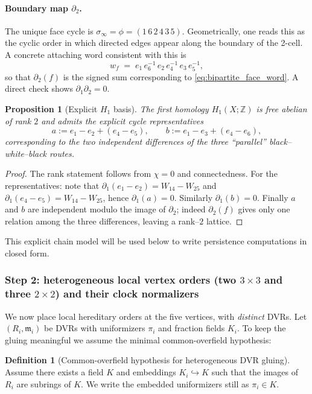 \documentclass[11pt,oneside]{amsbook}
\numberwithin{equation}{section}
\theoremstyle{plain}
\newtheorem{proposition}[theorem]{Proposition}
\theoremstyle{definition}
\newtheorem{definition}[theorem]{Definition}
\theoremstyle{remark}
\newcommand{\Z}{\mathbb{Z}}
\begin{document}
\paragraph{Boundary map $\partial_2$.}
The unique face cycle is $\sigma_\infty=\phi=(1\,6\,2\,4\,3\,5)$.
Geometrically, one reads this as the cyclic order in which directed edges appear along the boundary of the 2-cell.
A concrete attaching word consistent with this is
\begin{equation}
\label{eq:bipartite_face_word}
w_f \;=\; e_1\,e_6^{-1}\,e_2\,e_4^{-1}\,e_3\,e_5^{-1},
\end{equation}
so that $\partial_2(f)$ is the signed sum corresponding to \eqref{eq:bipartite_face_word}.
A direct check shows $\partial_1\partial_2=0$.

\begin{proposition}[Explicit $H_1$ basis]
The first homology $H_1(X;\Z)$ is free abelian of rank $2$ and admits the explicit cycle representatives
\[
a := e_1-e_2 + (e_4-e_5),\qquad 
b := e_1-e_3 + (e_4-e_6),
\]
corresponding to the two independent differences of the three ``parallel'' black--white--black routes.
\end{proposition}

\begin{proof}
The rank statement follows from $\chi=0$ and connectedness.
For the representatives: note that $\partial_1(e_1-e_2)=W_{14}-W_{25}$ and $\partial_1(e_4-e_5)=W_{14}-W_{25}$, hence $\partial_1(a)=0$.
Similarly $\partial_1(b)=0$.
Finally $a$ and $b$ are independent modulo the image of $\partial_2$; indeed $\partial_2(f)$ gives only one relation among the three differences, leaving a rank--$2$ lattice.
\end{proof}

This explicit chain model will be used below to write persistence computations in closed form.

\subsubsection{Step 2: heterogeneous local vertex orders (two $3\times 3$ and three $2\times 2$) and their clock normalizers}

We now place local hereditary orders at the five vertices, with \emph{distinct} DVRs.
Let $(R_i,\mathfrak m_i)$ be DVRs with uniformizers $\pi_i$ and fraction fields $K_i$.
To keep the gluing meaningful we assume the minimal common-overfield hypothesis:

\begin{definition}[Common-overfield hypothesis for heterogeneous DVR gluing]
\label{def:common_overfield}
Assume there exists a field $K$ and embeddings $K_i\hookrightarrow K$ such that the images of $R_i$ are subrings of $K$.
We write the embedded uniformizers still as $\pi_i\in K$.
\end{definition}
\end{document}
